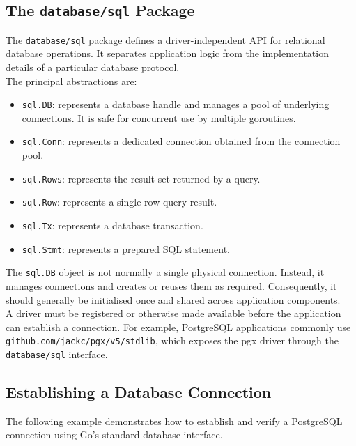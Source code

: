 \subsection{The \texttt{database/sql} Package}

The \texttt{database/sql} package defines a driver-independent API for relational database operations. It separates application logic from the implementation details of a particular database protocol.\\

The principal abstractions are:

\begin{itemize}
    \item \texttt{sql.DB}: represents a database handle and manages a pool of underlying connections. It is safe for concurrent use by multiple goroutines.
    \item \texttt{sql.Conn}: represents a dedicated connection obtained from the connection pool.
    \item \texttt{sql.Rows}: represents the result set returned by a query.
    \item \texttt{sql.Row}: represents a single-row query result.
    \item \texttt{sql.Tx}: represents a database transaction.
    \item \texttt{sql.Stmt}: represents a prepared SQL statement.
\end{itemize}

The \texttt{sql.DB} object is not normally a single physical connection. Instead, it manages connections and creates or reuses them as required. Consequently, it should generally be initialised once and shared across application components.\\

A driver must be registered or otherwise made available before the application can establish a connection. For example, PostgreSQL applications commonly use \texttt{github.com/jackc/pgx/v5/stdlib}, which exposes the pgx driver through the \texttt{database/sql} interface.

\subsection{Establishing a Database Connection}

The following example demonstrates how to establish and verify a PostgreSQL connection using Go's standard database interface.

